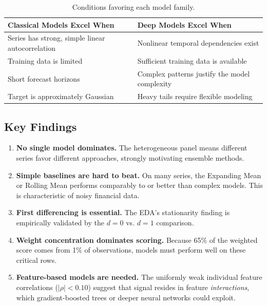 \begin{table}[H]
\centering
\caption{Conditions favoring each model family.}
\begin{tabularx}{\textwidth}{>{\raggedright\arraybackslash}X>{\raggedright\arraybackslash}X}
\toprule
\textbf{Classical Models Excel When} & \textbf{Deep Models Excel When} \\
\midrule
Series has strong, simple linear autocorrelation & Nonlinear temporal dependencies exist \\
Training data is limited & Sufficient training data is available \\
Short forecast horizons & Complex patterns justify the model complexity \\
Target is approximately Gaussian & Heavy tails require flexible modeling \\
\bottomrule
\end{tabularx}
\end{table}

\subsection{Key Findings}

\begin{enumerate}
    \item \textbf{No single model dominates.} The heterogeneous panel means different series favor different approaches, strongly motivating ensemble methods.

    \item \textbf{Simple baselines are hard to beat.} On many series, the Expanding Mean or Rolling Mean performs comparably to or better than complex models. This is characteristic of noisy financial data.

    \item \textbf{First differencing is essential.} The EDA's stationarity finding is empirically validated by the $d=0$ vs. $d=1$ comparison.

    \item \textbf{Weight concentration dominates scoring.} Because 65\% of the weighted score comes from 1\% of observations, models must perform well on these critical rows.

    \item \textbf{Feature-based models are needed.} The uniformly weak individual feature correlations ($|\rho| < 0.10$) suggest that signal resides in feature \emph{interactions}, which gradient-boosted trees or deeper neural networks could exploit.
\end{enumerate}

